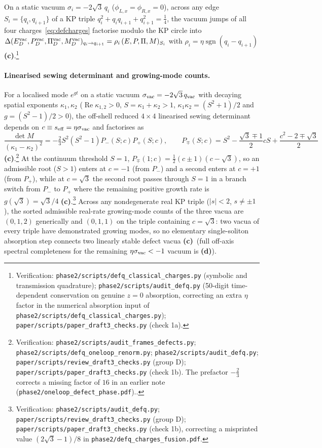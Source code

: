 \documentclass[11pt,a4paper]{article}
\newcommand{\lab}[1]{{\normalfont\sffamily\footnotesize\bfseries(#1)}}
\newcommand{\Lc}{\lab{c}}
\newcommand{\Ld}{\lab{d}}
\newcommand{\scr}[1]{\nolinkurl{#1}}
\newcommand{\chk}[1]{\footnote{\raggedright Verification: #1.}}
\newcommand{\sgn}{\operatorname{sgn}}
\theoremstyle{remark}
\begin{document}
On a static vacuum $\sigma_i=-2\sqrt3\,q_i$ ($\phi_{L,x}=\phi_{R,x}=0$), across any edge $S_i=\{q_i,q_{i+1}\}$ of a KP triple $q_i^2+q_iq_{i+1}+q_{i+1}^2=\tfrac14$, the vacuum jumps of all four charges~\eqref{eq:defcharges} factorise modulo the KP circle into $\Delta(E_D^{\rm vac},P_D^{\rm vac},\Pi_D^{\rm vac},M_D^{\rm vac})_{q_i\to q_{i+1}}=\rho_i\,(E,P,\Pi,M)_{S_i}$ with $\rho_i=\eta\sgn(q_i-q_{i+1})$ \Lc.\chk{\scr{phase2/scripts/defq_classical_charges.py} (symbolic and transmission quadrature); \scr{phase2/scripts/audit_defq.py} (50-digit time-dependent conservation on genuine $z=0$ absorption, correcting an extra $\eta$ factor in the numerical absorption input of \scr{phase2/scripts/defq_classical_charges.py}); \scr{paper/scripts/paper_draft3_checks.py} (check 1a)}

\paragraph{Linearised sewing determinant and growing-mode counts.} For a localised mode $e^{gt}$ on a static vacuum $\sigma_{\rm vac}=-2\sqrt3\,q_{\rm vac}$ with decaying spatial exponents $\kappa_1,\kappa_2$ ($\operatorname{Re}\kappa_{1,2}>0$, $S=\kappa_1+\kappa_2>1$, $\kappa_1\kappa_2=(S^2+1)/2$ and $g=(S^2-1)/2>0$), the off-shell reduced $4\times4$ linearised sewing determinant depends on $c\equiv s_{\rm eff}=\eta\sigma_{\rm vac}$ and factorises as
\begin{equation}\label{eq:detMdef}
\frac{\det M}{(\kappa_1-\kappa_2)^2}=-\tfrac23S^2(S^2-1)P_-(S;c)P_+(S;c),\qquad
P_\mp(S;c)=S^2-\frac{\sqrt3\mp1}2cS+\frac{c^2-2\mp\sqrt3}2
\end{equation}
\Lc.\chk{\scr{phase2/scripts/audit_frames_defects.py}; \scr{phase2/scripts/defq_oneloop_renorm.py}; \scr{phase2/scripts/audit_defq.py}; \scr{paper/scripts/review_draft3_checks.py} (group D); \scr{paper/scripts/paper_draft3_checks.py} (check 1b). The prefactor $-\tfrac23$ corrects a missing factor of $16$ in an earlier note (\scr{phase2/oneloop_defect_phase.pdf}).}
At the continuum threshold $S=1$, $P_\mp(1;c)=\tfrac12(c\pm1)(c-\sqrt3)$, so an admissible root ($S>1$) enters at $c=-1$ (from $P_-$) and a second enters at $c=+1$ (from $P_+$), while at $c=\sqrt3$ the second root passes through $S=1$ in a branch switch from $P_-$ to $P_+$ where the remaining positive growth rate is $g(\sqrt3)=\sqrt3/4$ \Lc.\chk{\scr{phase2/scripts/audit_defq.py}; \scr{paper/scripts/review_draft3_checks.py} (group D); \scr{paper/scripts/paper_draft3_checks.py} (check 1b), correcting a misprinted value $(2\sqrt3-1)/8$ in \scr{phase2/defq_charges_fusion.pdf}} Across any nondegenerate real KP triple ($|s|<2$, $s\neq\pm1$), the sorted admissible real-rate growing-mode counts of the three vacua are $(0,1,2)$ generically and $(0,1,1)$ on the triple containing $c=\sqrt3$: two vacua of every triple have demonstrated growing modes, so no elementary single-soliton absorption step connects two linearly stable defect vacua \Lc\ (full off-axis spectral completeness for the remaining $\eta\sigma_{\rm vac}<-1$ vacuum is \Ld).
\end{document}
